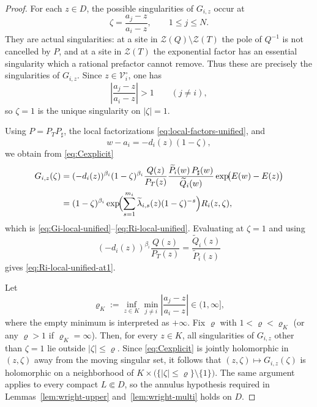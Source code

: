 \documentclass[reqno]{article}
\theoremstyle{definition}
\theoremstyle{remark}
\theoremstyle{plain}
\newcommand{\Z}{\mathcal Z}
\begin{document}
\begin{proof}
For each $z\in D$, the possible singularities of $G_{i,z}$ occur at
$$\zeta=\frac{a_j-z}{a_i-z},\qquad 1\le j\le N.$$
They are actual singularities: at a site in $\Z(Q)\setminus\Z(T)$ the pole of $Q^{-1}$ is not cancelled by $P$, and at a site in $\Z(T)$ the exponential factor has an essential singularity which a rational prefactor cannot remove. Thus these are precisely the singularities of $G_{i,z}$. Since $z\in\mathcal V_i^\circ$, one has
$$\left|\frac{a_j-z}{a_i-z}\right|>1\qquad(j\ne i),$$
so $\zeta=1$ is the unique singularity on $|\zeta|=1$.

Using $P=P_TP_\sharp$, the local factorizations \eqref{eq:local-factors-unified}, and
$$w-a_i=-d_i(z)(1-\zeta),$$
we obtain from \eqref{eq:Cexplicit}
\begin{align*}
G_{i,z}(\zeta)
&=(-d_i(z))^{\beta_i}(1-\zeta)^{\beta_i}
\frac{Q(z)}{P_T(z)}
\frac{\widetilde P_i(w)\,P_\sharp(w)}{\widetilde Q_i(w)}
\exp\!\bigl(E(w)-E(z)\bigr)\\
&=(1-\zeta)^{\beta_i}
\exp\!\Bigl(\sum_{s=1}^{m_i}\widetilde\lambda_{i,s}(z)(1-\zeta)^{-s}\Bigr)
R_i(z,\zeta),
\end{align*}
which is \eqref{eq:Gi-local-unified}--\eqref{eq:Ri-local-unified}. Evaluating at $\zeta=1$ and using
$$(-d_i(z))^{\beta_i}\frac{Q(z)}{P_T(z)}=\frac{\widetilde Q_i(z)}{\widetilde P_i(z)}$$
gives \eqref{eq:Ri-local-unified-at1}.

Let
$$\varrho_K:=\inf_{z\in K}\min_{j\ne i}\left|\frac{a_j-z}{a_i-z}\right|\in(1,\infty],$$
where the empty minimum is interpreted as $+\infty$. Fix $\varrho$ with $1<\varrho<\varrho_K$ (or any $\varrho>1$ if $\varrho_K=\infty$). Then, for every $z\in K$, all singularities of $G_{i,z}$ other than $\zeta=1$ lie outside $|\zeta|\le\varrho$. Since \eqref{eq:Cexplicit} is jointly holomorphic in $(z,\zeta)$ away from the moving singular set, it follows that $(z,\zeta)\mapsto G_{i,z}(\zeta)$ is holomorphic on a neighborhood of $K\times\bigl(\{|\zeta|\le\varrho\}\setminus\{1\}\bigr)$. The same argument applies to every compact $L\Subset D$, so the annulus hypothesis required in Lemmas~\ref{lem:wright-upper} and~\ref{lem:wright-multi} holds on $D$.


\end{proof}
\end{document}
